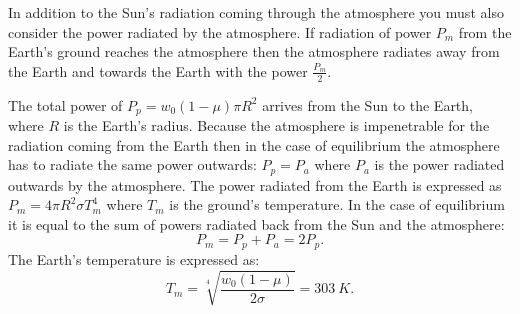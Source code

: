 {\ifEngHint
In addition to the Sun’s radiation coming through the atmosphere you must also consider the power radiated by the atmosphere. If radiation of power $P_m$ from the Earth’s ground reaches the atmosphere then the atmosphere radiates away from the Earth and towards the Earth with the power $\frac{P_m}{2}$.
\fi


\ifEngSolution
The total power of $P_p=w_0 \left(1-\mu\right)\pi R^2$ arrives from the Sun to the Earth, where $R$ is the Earth’s radius. Because the atmosphere is impenetrable for the radiation coming from the Earth then in the case of equilibrium the atmosphere has to radiate the same power outwards: $P_p=P_a$ where $P_a$ is the power radiated outwards by the atmosphere. The power radiated from the Earth is expressed as $P_m=4 \pi R^2 \sigma T_m^4$ where $T_m$ is the ground’s temperature. In the case of equilibrium it is equal to the sum of powers radiated back from the Sun and the atmosphere:
\[P_m=P_p+P_a=2P_p.\]
The Earth’s temperature is expressed as:
\[T_m=\sqrt[4]{\frac{w_0\left(1-\mu\right)}{2\sigma}}=\SI{303}{K}.\]
\fi
}